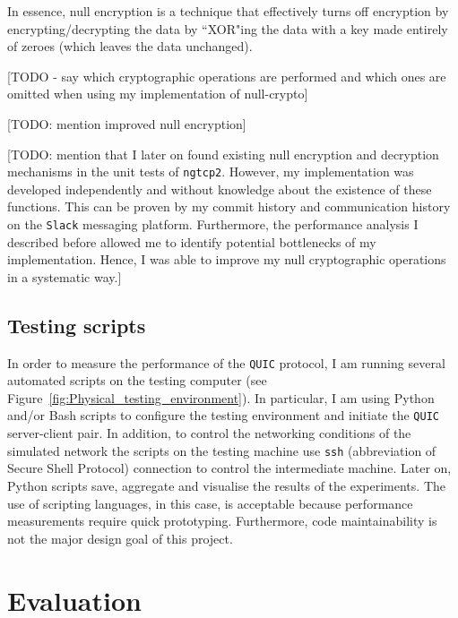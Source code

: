 \documentclass[12pt,a4paper,twoside,openright]{report}
\begin{document}
In essence, null encryption is a technique that effectively turns off encryption by encrypting/decrypting the data by ``XOR"ing the data with a key made entirely of zeroes (which leaves the data unchanged). 

[TODO - say which cryptographic operations are performed and which ones are omitted when using my implementation of null-crypto]


[TODO: mention improved null encryption]

[TODO: mention that I later on found existing null encryption and decryption mechanisms in the unit tests of \texttt{ngtcp2}. 
However, my implementation was developed independently and without knowledge about the existence of these functions.
This can be proven by my commit history and communication history on the \texttt{Slack} messaging platform.
Furthermore, the performance analysis I described before allowed me to identify potential bottlenecks of my implementation.
Hence, I was able to improve my null cryptographic operations in a systematic way.]





\section{Testing scripts}

In order to measure the performance of the \texttt{QUIC} protocol, I am running several automated scripts on the testing computer (see Figure~\ref{fig:Physical_testing_environment}).
In particular, I am using Python and/or Bash scripts to configure the testing environment and initiate the \texttt{QUIC} server-client pair.
In addition, to control the networking conditions of the simulated network the scripts on the testing machine use \texttt{ssh} (abbreviation of Secure Shell Protocol) connection to control the intermediate machine.
Later on, Python scripts save, aggregate and visualise the results of the experiments.
The use of scripting languages, in this case, is acceptable because performance measurements require quick prototyping.
Furthermore, code maintainability is not the major design goal of this project.






\chapter{Evaluation}
\end{document}

